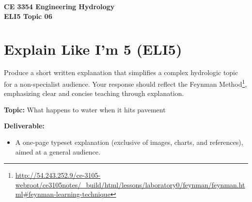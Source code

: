 \documentclass[12pt]{article}
\begin{document}
\begin{center}
    \textbf{CE 3354 Engineering Hydrology\\
    ELI5 Topic 06}
\end{center}

\section*{Explain Like I’m 5 (ELI5)}

Produce a short written explanation that simplifies a complex hydrologic topic for a non-specialist audience. Your response should reflect the Feynman Method\footnote{\url{http://54.243.252.9/ce-3105-webroot/ce3105notes/_build/html/lessons/laboratory0/feynman/feynman.html#feynman-learning-technique}}, emphasizing clear and concise teaching through explanation.

\textbf{Topic:} What happens to water when it hits pavement

\textbf{Deliverable:}
\begin{itemize}
    \item A one-page typeset explanation (exclusive of images, charts, and references), aimed at a general audience.
\end{itemize}
\end{document}
